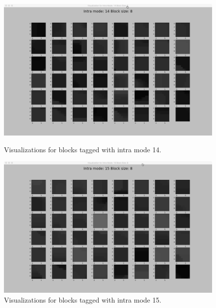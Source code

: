 \begin{figure}
        \vspace*{1cm} %
    
        \begin{minipage}{0.49\textwidth}
            \includegraphics[width=\linewidth]{Figures/visu-size8x8/8-14}
            \caption[Visualizations for blocks tagged with intra mode 14]{Visualizations for blocks tagged with intra mode 14.}
            \label{fig:size8_mode14}
        \end{minipage}
        \hspace{\fill} %
        \begin{minipage}{0.49\textwidth}
            \includegraphics[width=\linewidth]{Figures/visu-size8x8/8-15}
            \caption[Visualizations for blocks tagged with intra mode 15]{Visualizations for blocks tagged with intra mode 15.}
            \label{fig:size8_mode15}
        \end{minipage}
    \end{figure}
    
